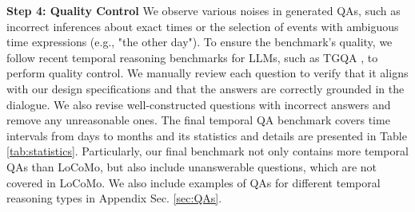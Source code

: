 \noindent \textbf{Step 4: Quality Control}
We observe various noises in generated QAs, such as incorrect inferences about exact times or the selection of events with ambiguous time expressions (e.g., "the other day"). To ensure the benchmark’s quality, we follow recent temporal reasoning benchmarks for LLMs, such as TGQA \cite{xiong-etal-2024-large}, to perform quality control. We manually review each question to verify that it aligns with our design specifications and that the answers are correctly grounded in the dialogue. We also revise well-constructed questions with incorrect answers and remove any unreasonable ones. The final temporal QA benchmark covers time intervals from days to months and its statistics and details are presented in Table \ref{tab:statistics}. Particularly, our final benchmark not only contains more temporal QAs than LoCoMo, but also include unanswerable questions, which are not covered in LoCoMo. We also include examples of QAs for different temporal reasoning types in Appendix Sec. \ref{sec:QAs}.